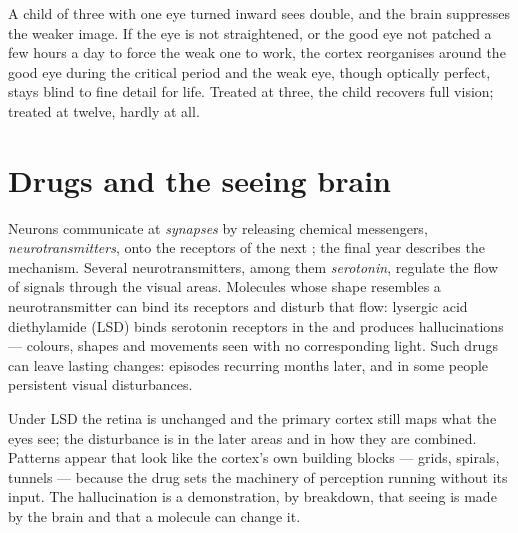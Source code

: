 \begin{example}\label{ex:g11:vision-and-brain:amblyopia}
A child of three with one eye turned inward sees double, and the brain
suppresses the weaker image. If the eye is not straightened, or the
good eye not patched a few hours a day to force the weak one to work,
the cortex reorganises around the good eye during the critical period
and the weak eye, though optically perfect, stays blind to fine
detail for life. Treated at three, the child recovers full vision;
treated at twelve, hardly at all.
\end{example}

\section{Drugs and the seeing brain}

\begin{proposition}\label{prop:g11:vision-and-brain:drugs}
Neurons communicate at \emph{synapses} by releasing chemical
messengers, \emph{neurotransmitters}, onto the receptors of the next
; the final year describes the mechanism. Several
neurotransmitters, among them \emph{serotonin}, regulate the flow of
signals through the visual areas. Molecules whose shape resembles a
neurotransmitter can bind its receptors and disturb that flow:
lysergic acid diethylamide (LSD) binds serotonin receptors in the
 and produces hallucinations --- colours, shapes and
movements seen with no corresponding light. Such drugs can leave
lasting changes: episodes recurring months later, and in some people
persistent visual disturbances.
\end{proposition}
\admitted

\begin{example}\label{ex:g11:vision-and-brain:hallucination}
Under LSD the retina is unchanged and the primary cortex still maps
what the eyes see; the disturbance is in the later areas and in how
they are combined. Patterns appear that look like the cortex's own
building blocks --- grids, spirals, tunnels --- because the drug sets
the machinery of perception running without its input. The
hallucination is a demonstration, by breakdown, that seeing is made by
the brain and that a molecule can change it.
\end{example}

